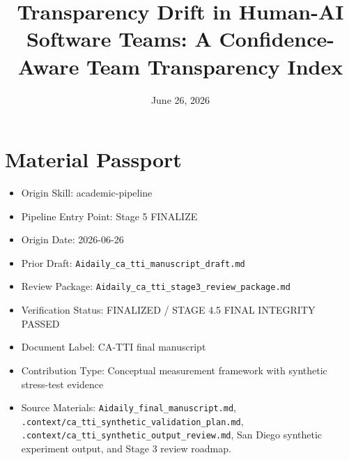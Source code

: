\documentclass[11pt]{article}
\title{Transparency Drift in Human-AI Software Teams: A Confidence-Aware Team Transparency Index}
\date{June 26, 2026}
\begin{document}
\maketitle
\tableofcontents
\newpage
\section{Material Passport}
\begin{itemize}[leftmargin=*]
\item Origin Skill: academic-pipeline
\item Pipeline Entry Point: Stage 5 FINALIZE
\item Origin Date: 2026-06-26
\item Prior Draft: \texttt{Aidaily\_ca\_tti\_manuscript\_draft.md}
\item Review Package: \texttt{Aidaily\_ca\_tti\_stage3\_review\_package.md}
\item Verification Status: FINALIZED / STAGE 4.5 FINAL INTEGRITY PASSED
\item Document Label: CA-TTI final manuscript
\item Contribution Type: Conceptual measurement framework with synthetic stress-test evidence
\item Source Materials: \texttt{Aidaily\_final\_manuscript.md}, \texttt{.context/ca\_tti\_synthetic\_validation\_plan.md}, \texttt{.context/ca\_tti\_synthetic\_output\_review.md}, San Diego synthetic experiment output, and Stage 3 review roadmap.
\end{itemize}
\end{document}
